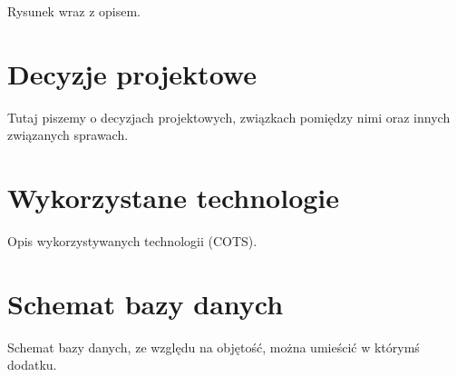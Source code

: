 Rysunek wraz z opisem.

\section{Decyzje projektowe}
\label{Chapter55}

Tutaj piszemy o decyzjach projektowych, związkach pomiędzy nimi oraz innych związanych sprawach.

\section{Wykorzystane technologie}
\label{Chapter56}

Opis wykorzystywanych technologii (COTS).

\section{Schemat bazy danych}
\label{Chapter57}

Schemat bazy danych, ze względu na objętość, można umieścić w którymś dodatku.